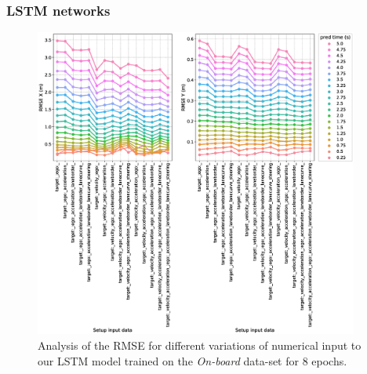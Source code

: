 \subsubsection{\ac{LSTM} networks}
\label{subsubsec:hyperparam_lstm}

\begin{figure}[t!]
  \centering
  \includegraphics[width=0.95\textwidth]{imgs/lstm_input_data_analysis.eps}
  \caption{Analysis of the \ac{RMSE} for different variations of numerical input to our \ac{LSTM} model trained on the \emph{On-board} data-set for \num{8} epochs.}\label{fig:lstm_input_data_analysis}
\end{figure}

